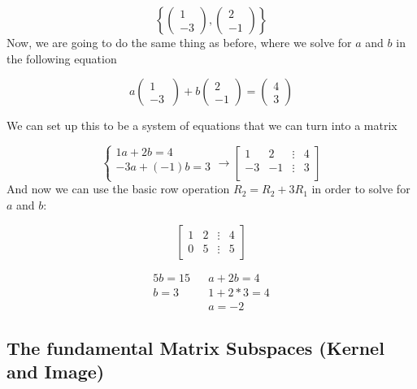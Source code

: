 \begin{problem}
    \[
      \left\{
        \begin{pmatrix}
          1\\-3
        \end{pmatrix}
        ,
        \begin{pmatrix}
          2\\-1
        \end{pmatrix}
      \right\}
    \]
    Now, we are going to do the same thing as before, where we solve for $a$ and $b$ in the following equation

    \[
      a
      \begin{pmatrix}
        1\\-3\
      \end{pmatrix}
      +b
      \begin{pmatrix}
        2\\-1
      \end{pmatrix}
      =
      \begin{pmatrix}
        4\\3
      \end{pmatrix}
    \]

    We can set up this to be a system of equations that we can turn into a matrix

    \[
      \begin{cases}
        1a+2b=4\\
        -3a+(-1)b=3\\
      \end{cases}
      \to
      \begin{bmatrix}
        1&2&\vdots&4\\
        -3&-1&\vdots&3\\
      \end{bmatrix}
    \]
    And now we can use the basic row operation $R_2=R_2+3R_1$ in order to solve for $a$ and $b$:

    \[
      \begin{bmatrix}
        1&2&\vdots&4\\
        0&5&\vdots&5
      \end{bmatrix}
    \]

    \begin{align*}
      5b=15 && a+2b=4\\
      b=3 && 1+2*3=4\\
      && a=-2
    \end{align*}
  \end{problem}
  
\subsection{The fundamental Matrix Subspaces (Kernel and Image)}

